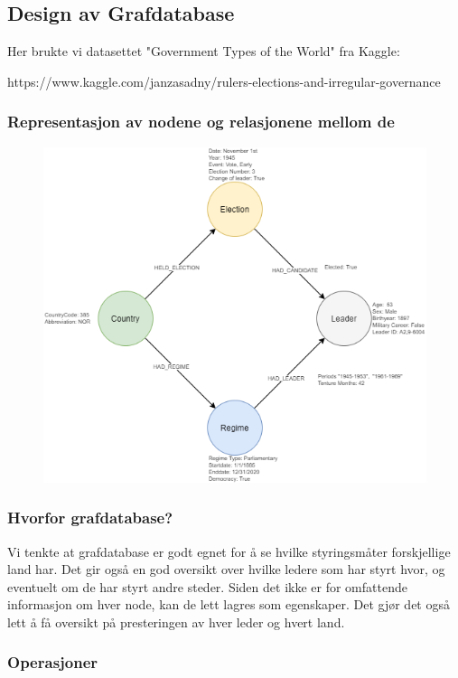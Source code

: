 \pagebreak
\subsection{Design av Grafdatabase}
Her brukte vi datasettet "Government Types of the World" fra Kaggle:


https://www.kaggle.com/janzasadny/rulers-elections-and-irregular-governance
\subsubsection{Representasjon av nodene og relasjonene mellom de}
\FigureCounter
\begin{figure}[H]
  \includegraphics[width=\textwidth]{images/milepael4/graph_database_base.drawio.png}
\end{figure}

\subsubsection{Hvorfor grafdatabase?}
Vi tenkte at grafdatabase er godt egnet for å se hvilke styringsmåter forskjellige land har. Det gir 
også en god oversikt over hvilke ledere som har styrt hvor, og eventuelt om de har styrt andre 
steder. Siden det ikke er for omfattende informasjon om hver node, kan de lett lagres som 
egenskaper. Det gjør det også lett å få oversikt på presteringen av hver leder og hvert land.

\subsubsection{Operasjoner}


